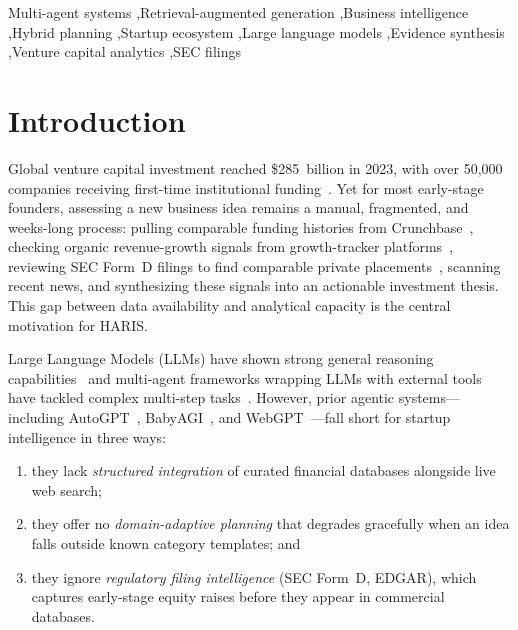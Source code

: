 \documentclass[preprint,12pt]{elsarticle}
\begin{document}
\begin{frontmatter}
\begin{keyword}
Multi-agent systems \sep Retrieval-augmented generation \sep Business intelligence
\sep Hybrid planning \sep Startup ecosystem \sep Large language models
\sep Evidence synthesis \sep Venture capital analytics \sep SEC filings
\end{keyword}

\end{frontmatter}

\section{Introduction}
\label{sec:intro}

Global venture capital investment reached \$285~billion in 2023, with over
50,000 companies receiving first-time institutional funding~\cite{kpmg2024}.
Yet for most early-stage founders, assessing a new business idea remains a
manual, fragmented, and weeks-long process: pulling comparable funding histories
from Crunchbase~\cite{crunchbase2025}, checking organic revenue-growth signals
from growth-tracker platforms~\cite{growjo2025}, reviewing SEC Form~D filings to
find comparable private placements~\cite{sec2025}, scanning recent news, and
synthesizing these signals into an actionable investment thesis. This gap between
data availability and analytical capacity is the central motivation for HARIS.

Large Language Models (LLMs) have shown strong general reasoning
capabilities~\cite{brown2020,wei2022} and multi-agent frameworks wrapping LLMs
with external tools have tackled complex multi-step tasks~\cite{wang2024survey,
xi2023rise}. However, prior agentic systems---including
AutoGPT~\cite{autogpt2023}, BabyAGI~\cite{babyagi2023}, and
WebGPT~\cite{nakano2021}---fall short for startup intelligence in three ways:
\begin{enumerate}[label=(\alph*)]
  \item they lack \emph{structured integration} of curated financial databases
        alongside live web search;
  \item they offer no \emph{domain-adaptive planning} that degrades gracefully
        when an idea falls outside known category templates; and
  \item they ignore \emph{regulatory filing intelligence} (SEC Form~D, EDGAR),
        which captures early-stage equity raises before they appear in commercial
        databases.
\end{enumerate}
\end{document}

